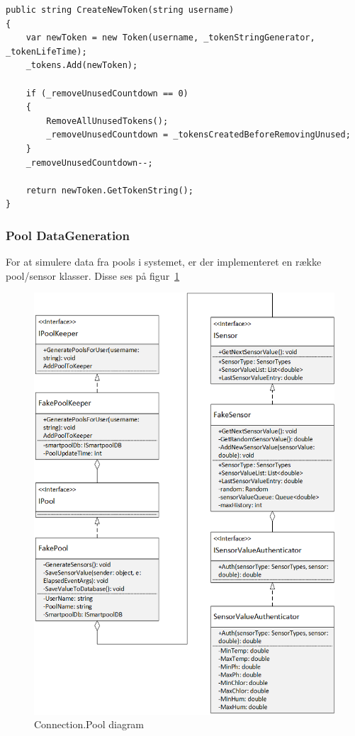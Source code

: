 \begin{lstlisting}[caption=Server.TokenKeeper.CreateNewToken, label=code:Server.TokenKeeper.CreateNewToken]
public string CreateNewToken(string username)
{
	var newToken = new Token(username, _tokenStringGenerator, _tokenLifeTime);
	_tokens.Add(newToken);
	
	if (_removeUnusedCountdown == 0)
	{
		RemoveAllUnusedTokens();
		_removeUnusedCountdown = _tokensCreatedBeforeRemovingUnused;
	}
	_removeUnusedCountdown--;
	
	return newToken.GetTokenString();
}
\end{lstlisting}

\subsubsection{Pool DataGeneration}
For at simulere data fra pools i systemet, er der implementeret en række pool/sensor klasser. Disse ses på figur~\ref{fig:ConnectionPool}
\begin{figure}
	\centering
	\includegraphics[width=0.8\linewidth]{figs/connection/ConnectionPool.png}
	\caption{Connection.Pool diagram}
	\label{fig:ConnectionPool}
\end{figure}

